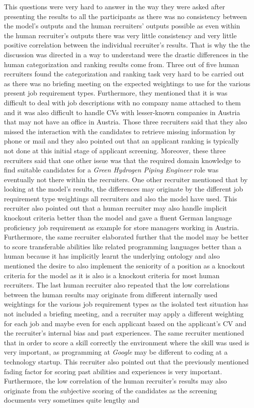 \documentclass[draft,final]{thesisclass} %
\begin{document}
\begin{enumerate}
\begin{itemize}
        This questions were very hard to answer in the way they were asked after presenting the results to all the participants as there was no consistency between the model's outputs and the human recruiters' outputs possible as even within the human recruiter's outputs there was very little consistency and very little positive correlation between the individual recruiter's results. That is why the the discussion was directed in a way to understand were the drastic differences in the human categorization and ranking results come from. Three out of five human recruiters found the categorization and ranking task very hard to be carried out as there was no briefing meeting on the expected weightings to use for the various present job requirement types. Furthermore, they mentioned that it is was difficult to deal with job descriptions with no company name attached to them and it was also difficult to handle \acs{CV}s with lesser-known companies in Austria that may not have an office in Austria. Those three recruiters said that they also missed the interaction with the candidates to retrieve missing information by phone or mail and they also pointed out that an applicant ranking is typically not done at this initial stage of applicant screening. Moreover, these three recruiters said that one other issue was that the required domain knowledge to find suitable candidates for a \textit{Green Hydrogen Piping Engineer} role was eventually not there within the recruiters. One other recruiter mentioned that by looking at the model's results, the differences may originate by the different job requirement type weightings all recruiters and also the model have used. This recruiter also pointed out that a human recruiter may also handle implicit knockout criteria better than the model and gave a fluent German language proficiency job requirement as example for store managers working in Austria. Furthermore, the same recruiter elaborated further that the model may be better to score transferable abilities like related programming languages better than a human because it has implicitly learnt the underlying ontology and also mentioned the desire to also implement the seniority of a position as a knockout criteria for the model as it is also is a knockout criteria for most human recruiters. The last human recruiter also repeated that the low correlations between the human results may originate from different internally used weightings for the various job requirement types as the isolated test situation has not included a briefing meeting, and a recruiter may apply a different weighting for each job and maybe even for each applicant based on the applicant's \acs{CV} and the recruiter's internal bias and past experiences. The same recruiter mentioned that in order to score a skill correctly the environment where the skill was used is very important, as programming at \textit{Google} may be different to coding at a technology startup. This recruiter also pointed out that the previously mentioned fading factor for scoring past abilities and experiences is very important. Furthermore, the low correlation of the human recruiter's results may also originate from the subjective scoring of the candidates as the screening documents very sometimes quite lengthy and 
\end{itemize}
\end{enumerate}
\end{document}
